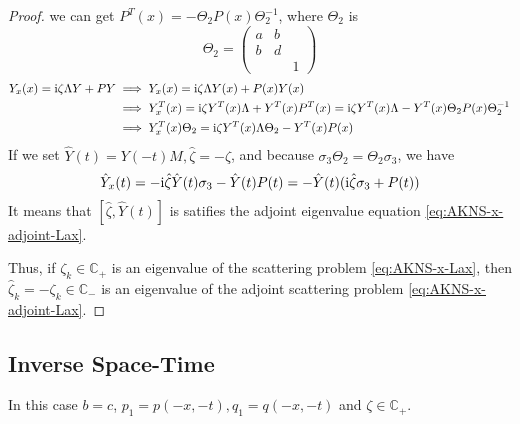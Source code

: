 \begin{proof}
    we can get $ P^{T}(x) = -\Theta_{2} P(x) \Theta_{2}^{-1} $, where $ \Theta_{2} $ is 
    \begin{equation}
        \Theta_{2} = \begin{pmatrix}
            a & b & \\ b & d & \\ & & 1
        \end{pmatrix}
    \end{equation}
    \begin{equation}
        \begin{aligned}
            Y_{x}(x) = \mathrm{i} \zeta \Lambda Y + PY &\implies  Y_{x}(x) = \mathrm{i} \zeta \Lambda Y(x) + P(x)Y(x) \\
             &\implies Y_{x}^{T}(x) = \mathrm{i} \zeta Y^{T}(x) \Lambda + Y^{T}(x) P^{T}(x) = \mathrm{i} \zeta Y^{T}(x) \Lambda - Y^{T}(x) \Theta_{2} P(x) \Theta_{2}^{-1} \\
             &\implies Y_{x}^{T}(x) \Theta_{2} = \mathrm{i} \zeta Y^{T}(x) \Lambda \Theta_{2} - Y^{T}(x) P(x) 
         \end{aligned}
    \end{equation}
    If we set $ \hat{Y}(t) = Y(-t)M, \hat{\zeta} = -\zeta $, and because $ \sigma_{3}\Theta_{2} = \Theta_{2} \sigma_{3} $, we have
    \begin{equation}
        \hat{Y}_{x}(t) = -\mathrm{i} \hat{\zeta} \hat{Y}(t) \sigma_{3} - \hat{Y}(t) P(t) = -\hat{Y}(t)(\mathrm{i} \hat{\zeta}\sigma_{3} + P(t))
    \end{equation}
    It means that $ [\hat{\zeta}, \hat{Y}(t)] $ is satifies the adjoint eigenvalue equation \eqref{eq:AKNS-x-adjoint-Lax}.

    Thus, if $ \zeta_{k} \in \mathbb{C}_{+}$ is an eigenvalue of the scattering problem \eqref{eq:AKNS-x-Lax}, then $ \hat{\zeta}_{k} = - \zeta_{k} \in \mathbb{C}_{-} $ is an eigenvalue of the adjoint scattering problem \eqref{eq:AKNS-x-adjoint-Lax}. %
\end{proof}

\subsection{Inverse Space-Time}
In this case $ b = c $, $ p_{1} = p(-x,-t), q_{1} = q(-x,-t) $ and $ \zeta \in \mathbb{C}_{+} $.

